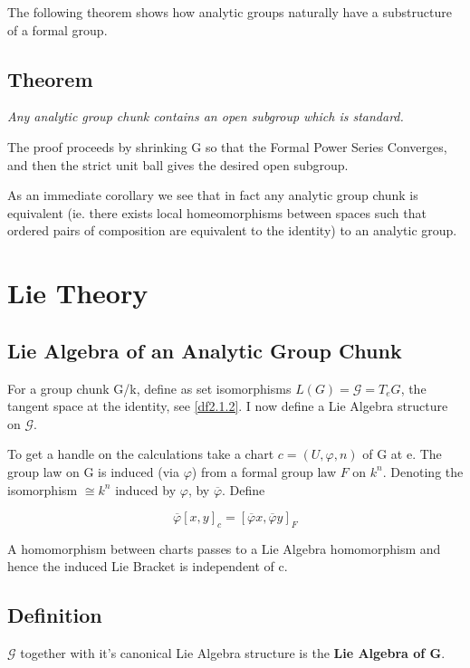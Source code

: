 The following theorem shows how analytic groups naturally have a
substructure of a formal group.



\subsection{Theorem}\label{df2.4.1}
\emph{Any analytic group chunk contains an open subgroup which is
standard.}

The proof proceeds by shrinking G so that the Formal Power Series
Converges, and then the strict unit ball gives the desired open
subgroup.

As an immediate corollary we see that in fact any analytic group
chunk is equivalent (ie. there exists local homeomorphisms between
spaces such that ordered pairs of composition are equivalent to
the identity) to an analytic group.





\section{Lie Theory}\label{df2.5}

\subsection{Lie Algebra of an Analytic Group
Chunk}\label{df2.5.1}

For a group chunk G/k, define as set isomorphisms $L(G) = \mathcal
G = T_eG$, the tangent space at the identity, see \ref{df2.1.2}. I
now define a Lie Algebra structure on $\mathcal G$.

To get a handle on the calculations take a chart $c = (U, \varphi,
n)$ of G at e. The group law on G is induced (via $\varphi$) from
a formal group law $F$ on $k^n$. Denoting the isomorphism
$\mathcal \cong k^n$ induced by $\varphi$, by
$\overline{\varphi}$. Define

$$\overline{\varphi} {[x,y]}_c = {[\overline \varphi x, \overline
\varphi y]}_F$$

A homomorphism between charts passes to a Lie Algebra homomorphism
and hence the induced Lie Bracket is independent of c.

\subsection{Definition}\label{df2.5.2}
$\mathcal G$ together with it's canonical Lie Algebra structure is
the \textbf{Lie Algebra of G}.

